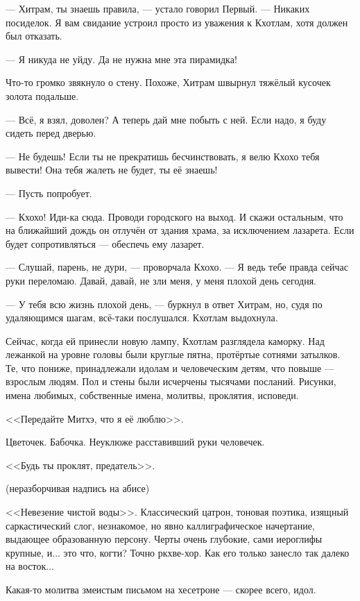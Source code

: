 --- Хитрам, ты знаешь правила, --- устало говорил Первый.
--- Никаких посиделок.
Я вам свидание устроил просто из уважения к Кхотлам, хотя должен был отказать.

--- Я никуда не уйду.
Да не нужна мне эта пирамидка!

Что-то громко звякнуло о стену.
Похоже, Хитрам швырнул тяжёлый кусочек золота подальше.

--- Всё, я взял, доволен?
А теперь дай мне побыть с ней.
Если надо, я буду сидеть перед дверью.

--- Не будешь!
Если ты не прекратишь бесчинствовать, я велю Кхохо тебя вывести!
Она тебя жалеть не будет, ты её знаешь!

--- Пусть попробует.

--- Кхохо!
Иди-ка сюда.
Проводи городского на выход.
И скажи остальным, что на ближайший дождь он отлучён от здания храма, за исключением лазарета.
Если будет сопротивляться --- обеспечь ему лазарет.

--- Слушай, парень, не дури, --- проворчала Кхохо.
--- Я ведь тебе правда сейчас руки переломаю.
Давай, давай, не зли меня, у меня плохой день сегодня.

--- У тебя всю жизнь плохой день, --- буркнул в ответ Хитрам, но, судя по удаляющимся шагам, всё-таки послушался.
Кхотлам выдохнула.

\asterism

Сейчас, когда ей принесли новую лампу, Кхотлам разглядела каморку.
Над лежанкой на уровне головы были круглые пятна, протёртые сотнями затылков.
Те, что пониже, принадлежали идолам и человеческим детям, что повыше --- взрослым людям.
Пол и стены были исчерчены тысячами посланий.
Рисунки, имена любимых, собственные имена, молитвы, проклятия, исповеди.

<<Передайте Митхэ, что я её люблю>>.

Цветочек.
Бабочка.
Неуклюже расставивший руки человечек.

<<Будь ты проклят, предатель>>.

(неразборчивая надпись на абисе)

<<Невезение чистой воды>>.
Классический цатрон, тоновая поэтика, изящный саркастический слог, незнакомое, но явно каллиграфическое начертание, выдающее образованную персону.
Черты очень глубокие, сами иероглифы крупные, и... это что, когти?
Точно ркхве-хор.
Как его только занесло так далеко на восток...

Какая-то молитва змеистым письмом на хесетроне --- скорее всего, идол.

